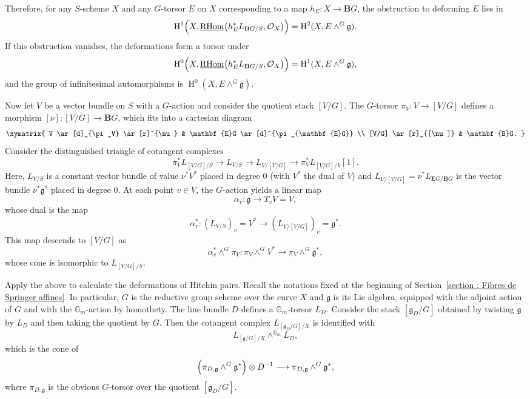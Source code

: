 \documentclass[12pt,english]{smfart}
\numberwithin{equation}{subsection}
\theoremstyle{remark}
\begin{document}
Therefore, for any $S$-scheme $X$ and any $G$-torsor $E$ on $X$ corresponding to a map $h_E:X\rightarrow \mathbf{B}G$,
the obstruction to deforming $E$ lies in
$$
\operatorname{H}^1\Bigl(X,\underline{\operatorname{RHom}}\bigl(h_E^*L_{\mathbf{B}G/S},\mathcal{O}_X\bigr)\Bigr)=\operatorname{H}^2(X,E\wedge^G \mathfrak{g}).
$$
If this obstruction vanishes, the deformations form a torsor under
$$
\operatorname{H}^0\Bigl(X,\underline{\operatorname{RHom}}\bigl(h_E^*L_{\mathbf{B}G/S},\mathcal{O}_X\bigr)\Bigr)=\operatorname{H}^1(X,E\wedge^G \mathfrak{g}),
$$
and the group of infinitesimal automorphisms is $\operatorname{H}^0(X,E\wedge^G \mathfrak{g})$.

Now let $V$ be a vector bundle on $S$ with a $G$-action and consider the quotient stack $[V/G]$.
The $G$-torsor $\pi_V:V\rightarrow [V/G]$ defines a morphism $[\nu]:[V/G]\rightarrow \mathbf{B}G$,
which fits into a cartesian diagram
$$
\xymatrix{
V \ar[d]_{\pi_V} \ar[r]^{\nu} & \mathbf{E}G \ar[d]^{\pi_{\mathbf{E}G}} \\
[V/G] \ar[r]_{[\nu]} & \mathbf{B}G.
}
$$
Consider the distinguished triangle of cotangent complexes
$$
\pi_V^* L_{[V/G]/S}\longrightarrow L_{V/S}\longrightarrow L_{V/[V/G]}\longrightarrow \pi_V^* L_{[V/G]/k}[1].
$$
Here, $L_{V/S}$ is a constant vector bundle of value $\nu^*V^*$ placed in degree $0$ (with $V^*$ the dual of $V$)
and $L_{V/[V/G]}=\nu^*L_{\mathbf{E}G/\mathbf{B}G}$ is the vector bundle $\nu^*\mathfrak{g}^*$ placed in degree $0$.
At each point $v\in V$, the $G$-action yields a linear map
$$
\alpha_v:\mathfrak{g}\longrightarrow T_v V=V,
$$
whose dual is the map
$$
\alpha_v^*:(L_{V/S})_v=V^*\longrightarrow (L_{V/[V/G]})_v=\mathfrak{g}^*.
$$
This map descends to $[V/G]$ as
$$
\alpha_v^*\wedge^G \pi_V:
\pi_V\wedge^G V^*\longrightarrow \pi_V\wedge^G \mathfrak{g}^*,
$$
whose cone is isomorphic to $L_{[V/G]/S}$.

Apply the above to calculate the deformations of Hitchin pairs.
Recall the notations fixed at the beginning of Section~\ref{section : Fibres de Springer affines}.
In particular, $G$ is the reductive group scheme over the curve $X$ and $\mathfrak{g}$ is its Lie algebra,
equipped with the adjoint action of $G$ and with the $\mathbb{G}_m$-action by homothety.
The line bundle $D$ defines a $\mathbb{G}_m$-torsor $L_D$. Consider the stack $[\mathfrak{g}_D/G]$ obtained by twisting
$\mathfrak{g}$ by $L_D$ and then taking the quotient by $G$. Then the cotangent complex $L_{[\mathfrak{g}_D/G]/X}$ is identified with
$$
L_{[\mathfrak{g}/G]/X}\wedge^{\mathbb{G}_m} L_D,
$$
which is the cone of
$$
\Bigl(\pi_{D,\mathfrak{g}}\wedge^G\mathfrak{g}^*\Bigr)\otimes D^{-1}\longrightarrow \pi_{D,\mathfrak{g}}\wedge^G\mathfrak{g}^*,
$$
where $\pi_{D,\mathfrak{g}}$ is the obvious $G$-torsor over the quotient $[\mathfrak{g}_D/G]$.
\end{document}
